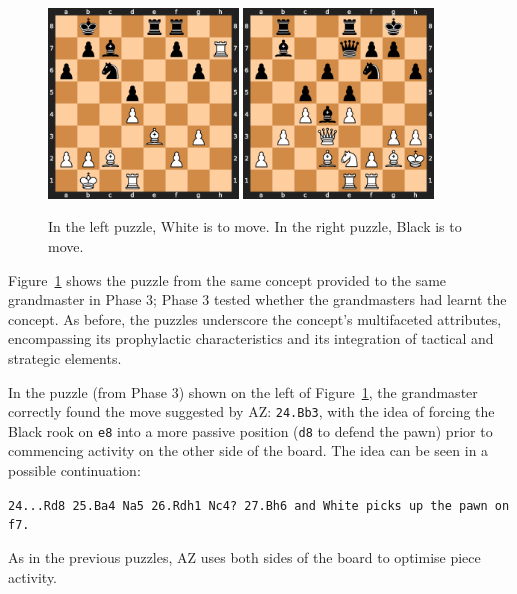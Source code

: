 \documentclass{article}
\newcommand{\ct}[1]{\texttt{#1}}
\begin{document}
\begin{figure}[!ht]
\caption{In the left puzzle, White is to move. In the right puzzle, Black is to move.}
\centering
\includegraphics[width=0.45\textwidth]{chess_positions/bb3.png}
\hspace{0.02\textwidth}
\includegraphics[width=0.45\textwidth]{chess_positions/bc6.png}
\label{fig:concept_apply}
\end{figure}

Figure~\ref{fig:concept_apply} shows the puzzle from the same concept provided to the same grandmaster in Phase 3; Phase 3 tested whether the grandmasters had learnt the concept.
As before, the puzzles underscore the concept's multifaceted attributes, encompassing its prophylactic characteristics and its integration of tactical and strategic elements.

In the puzzle (from Phase 3) shown on the left of Figure~\ref{fig:concept_apply}, the grandmaster correctly found the move suggested by AZ: \ct{24.Bb3}, with the idea of forcing the Black rook on \ct{e8} into a more passive position (\ct{d8} to defend the pawn) prior to commencing activity on the other side of the board. 
The idea can be seen in a possible continuation: 
\begin{displayquote}
\ct{24...Rd8 25.Ba4 Na5 26.Rdh1 Nc4?~27.Bh6 and White picks up the pawn on f7.}
\end{displayquote}
As in the previous puzzles, AZ uses both sides of the board to optimise piece activity. 
\end{document}
